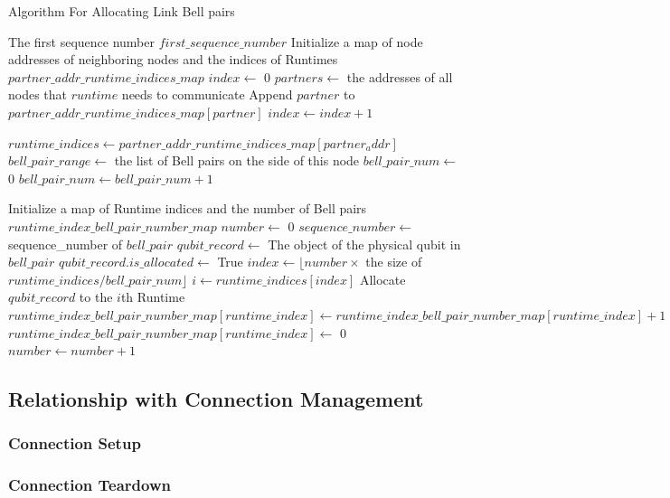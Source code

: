 \begin{algorithm}[H]  
  \caption{Algorithm For Allocating Link Bell pairs}                 
  \begin{algorithmic}[1]
    \Require The first sequence number $first\_sequence\_number$
    \State Initialize a map of node addresses of neighboring nodes and the indices of Runtimes $partner\_addr\_runtime\_indices\_map$
    \State $index \gets$ 0
      \State $partners \gets$ the addresses of all nodes that $runtime$ needs to communicate
        \State Append $partner$ to $partner\_addr\_runtime\_indices\_map[partner]$
      \EndFor
      \State $index \gets index + 1$
    \EndFor

      \State $runtime\_indices \gets partner\_addr\_runtime\_indices\_map[partner_addr]$
      \State $bell\_pair\_range \gets$ the list of Bell pairs on the side of this node
      \State $bell\_pair\_num \gets$ 0
        \State $bell\_pair\_num \gets bell\_pair\_num + 1$
      \EndFor

      \State  Initialize a map of Runtime indices and the number of Bell pairs $runtime\_index\_bell\_pair\_number\_map$
      \State $number \gets$ 0
        \State $sequence\_number \gets$ sequence\_number of $bell\_pair$
          \State $qubit\_record \gets$ The object of the physical qubit in $bell\_pair$
            \State $qubit\_record.is\_allocated \gets$ True
            \State $index \gets \lfloor number \times $ the size of $runtime\_indices / bell\_pair\_num \rfloor$
            \State $i \gets runtime\_indices[index]$
            \State Allocate $qubit\_record$ to the $i$th Runtime
              \State $runtime\_index\_bell\_pair\_number\_map[runtime\_index] \gets runtime\_index\_bell\_pair\_number\_map[runtime\_index] + 1$
            \Else
              \State $runtime\_index\_bell\_pair\_number\_map[runtime\_index] \gets$ 0
            \EndIf
          \EndIf
        \EndIf
        \State $number \gets number + 1$
      \EndFor
    \EndFor
  \end{algorithmic}
\end{algorithm}


\subsection{Relationship with Connection Management}
\subsubsection{Connection Setup}
\subsubsection{Connection Teardown}


